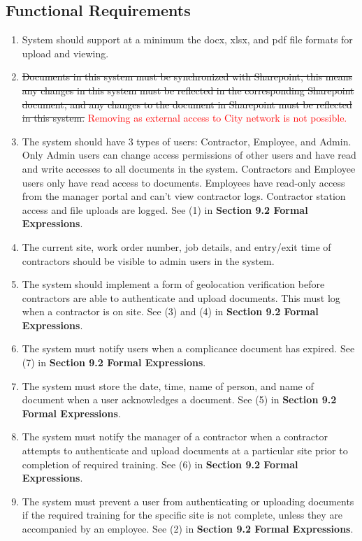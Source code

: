 \documentclass[12pt]{article}
\begin{document}
\subsection{Functional Requirements}
\begin{enumerate} [{FR}1.]
  \item System should support at a minimum the docx, xlsx, and pdf
    file formats for upload and viewing.
  \item \sout{Documents in this system must be synchronized with
      Sharepoint, this means any changes in this system must be
      reflected in the corresponding Sharepoint document, and any
    changes to the document in Sharepoint must be reflected in this system.}
    \textcolor{red}{Removing as external access to City network is not possible.}
  \item The system should have 3 types of users: Contractor, Employee, and Admin. 
    Only Admin users can change
    access permissions of other users and have read and write
    accesses to all documents in the system. Contractors and Employee
    users only have read access to documents. Employees have read-only access from the manager portal
    and can't view contractor logs. Contractor station access and file uploads are logged.
    See (1) in \textbf{Section 9.2 Formal Expressions}.
  \item The current site, work order number, job details, and entry/exit time of
    contractors should be visible to admin users in the system.
  \item The system should implement a form of geolocation verification before
    contractors are able to authenticate and upload documents. This must log when a contractor is on site. See (3) and
    (4) in \textbf{Section 9.2 Formal Expressions}.
  \item The system must notify users when a complicance document has expired.
    See (7) in \textbf{Section 9.2 Formal Expressions}.
  \item The system must store the date, time, name of person, and name of
    document when a user acknowledges a document. See (5) in
    \textbf{Section 9.2 Formal Expressions}.
  \item The system must notify the manager of a contractor when a contractor
    attempts to authenticate and upload documents at a particular site prior to
    completion of required training. See (6) in
    \textbf{Section 9.2 Formal Expressions}.
  \item The system must prevent a user from authenticating or uploading
    documents if the required training for the specific site is not complete, unless they are accompanied by an employee.
    See (2) in \textbf{Section 9.2 Formal Expressions}.

\end{enumerate}
\end{document}
